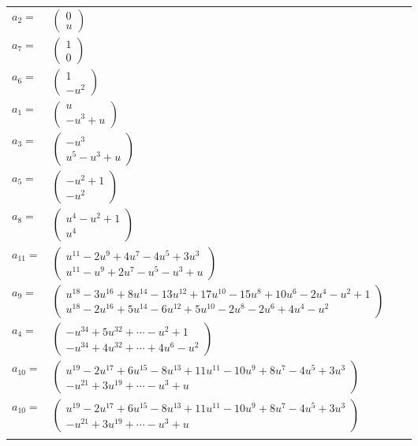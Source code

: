 \documentclass[1p]{elsarticle_modified}
\theoremstyle{definition}
\begin{document}
\begin{tabular}{m{7pt} m{180pt} m{7pt} m{180pt} }
\flushright $a_{2}=$&$\begin{pmatrix}0\\u\end{pmatrix}$ \\
\flushright $a_{7}=$&$\begin{pmatrix}1\\0\end{pmatrix}$ \\
\flushright $a_{6}=$&$\begin{pmatrix}1\\- u^2\end{pmatrix}$ \\
\flushright $a_{1}=$&$\begin{pmatrix}u\\- u^3+u\end{pmatrix}$ \\
\flushright $a_{3}=$&$\begin{pmatrix}- u^3\\u^5- u^3+u\end{pmatrix}$ \\
\flushright $a_{5}=$&$\begin{pmatrix}- u^2+1\\- u^2\end{pmatrix}$ \\
\flushright $a_{8}=$&$\begin{pmatrix}u^4- u^2+1\\u^4\end{pmatrix}$ \\
\flushright $a_{11}=$&$\begin{pmatrix}u^{11}-2 u^9+4 u^7-4 u^5+3 u^3\\u^{11}- u^9+2 u^7- u^5- u^3+u\end{pmatrix}$ \\
\flushright $a_{9}=$&$\begin{pmatrix}u^{18}-3 u^{16}+8 u^{14}-13 u^{12}+17 u^{10}-15 u^8+10 u^6-2 u^4- u^2+1\\u^{18}-2 u^{16}+5 u^{14}-6 u^{12}+5 u^{10}-2 u^8-2 u^6+4 u^4- u^2\end{pmatrix}$ \\
\flushright $a_{4}=$&$\begin{pmatrix}- u^{34}+5 u^{32}+\cdots- u^2+1\\- u^{34}+4 u^{32}+\cdots+4 u^6- u^2\end{pmatrix}$ \\
\flushright $a_{10}=$&$\begin{pmatrix}u^{19}-2 u^{17}+6 u^{15}-8 u^{13}+11 u^{11}-10 u^9+8 u^7-4 u^5+3 u^3\\- u^{21}+3 u^{19}+\cdots- u^3+u\end{pmatrix}$\\ \flushright $a_{10}=$&$\begin{pmatrix}u^{19}-2 u^{17}+6 u^{15}-8 u^{13}+11 u^{11}-10 u^9+8 u^7-4 u^5+3 u^3\\- u^{21}+3 u^{19}+\cdots- u^3+u\end{pmatrix}$\\&\end{tabular}
\end{document}
